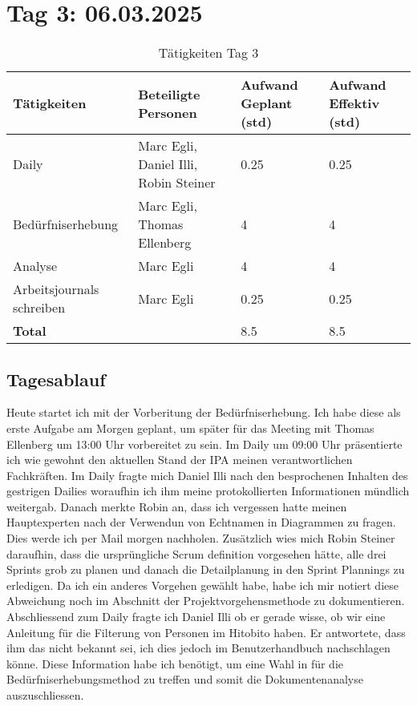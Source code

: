 \section{Tag 3: 06.03.2025}
\begin{table}[H]
    \begin{tabular}{|L{0.4\textwidth}|C{60pt}|C{60pt}|C{60pt}|}
        \hline
        \color{white}Tätigkeiten & \color{white}Beteiligte \color{white}Personen & \color{white}Aufwand Geplant (std) & \color{white}Aufwand Effektiv (std) \\
        \hline
        Daily & Marc Egli, Daniel Illi, Robin Steiner & 0.25 & 0.25 \\
        \hline
        Bedürfniserhebung & Marc Egli, Thomas Ellenberg & 4 & 4 \\
        \hline
        Analyse & Marc Egli & 4 & 4 \\
        \hline
        Arbeitsjournals schreiben & Marc Egli & 0.25 & 0.25 \\
        \textbf{Total} &   & 8.5 & 8.5 \\
        \hline
    \end{tabular}
    \caption{Tätigkeiten Tag 3}
\end{table}

\subsection*{Tagesablauf}
Heute startet ich mit der Vorberitung der Bedürfniserhebung. Ich habe diese als erste Aufgabe am Morgen geplant,
um später für das Meeting mit Thomas Ellenberg um 13:00 Uhr vorbereitet zu sein. Im Daily um 09:00 Uhr präsentierte ich wie gewohnt den 
aktuellen Stand der IPA meinen verantwortlichen Fachkräften. Im Daily fragte mich Daniel Illi nach den besprochenen Inhalten des gestrigen Dailies
woraufhin ich ihm meine protokollierten Informationen mündlich weitergab. Danach merkte Robin an, dass ich vergessen hatte meinen Hauptexperten nach der 
Verwendun von Echtnamen in Diagrammen zu fragen. Dies werde ich per Mail morgen nachholen. Zusätzlich wies mich Robin Steiner daraufhin, dass die ursprüngliche
Scrum definition vorgesehen hätte, alle drei Sprints grob zu planen und danach die Detailplanung in den Sprint Plannings zu erledigen. Da ich ein anderes Vorgehen gewählt
habe, habe ich mir notiert diese Abweichung noch im Abschnitt der Projektvorgehensmethode zu dokumentieren. Abschliessend zum Daily fragte ich Daniel Illi ob er gerade
wisse, ob wir eine Anleitung für die Filterung von Personen im Hitobito haben. Er antwortete, dass ihm das nicht bekannt sei, ich dies jedoch im Benutzerhandbuch nachschlagen
könne. Diese Information habe ich benötigt, um eine Wahl in für die Bedürfniserhebungsmethod zu treffen und somit die Dokumentenanalyse
auszuschliessen.


